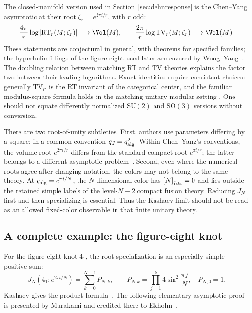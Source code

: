 The closed-manifold version used in Section~\ref{sec:dehnresponse}
is the Chen--Yang asymptotic at their root $\zeta_r=e^{2\pi i/r}$,
with $r$ odd:
\begin{equation}
 \frac{4\pi}{r}\log|\mathrm{RT}_r(M;\zeta_r)|\longrightarrow\Vol(M),
 \qquad
 \frac{2\pi}{r}\log\mathrm{TV}_r(M;\zeta_r)\longrightarrow\Vol(M).
 \label{eq:introclosedvolume}
\end{equation}
These statements are conjectural in general, with theorems for
specified families; the hyperbolic fillings of the figure-eight used
later are covered by Wong--Yang~\cite{WongYangDehn}. The doubling
relation between matching RT and TV theories explains the factor
two between their leading logarithms. Exact identities require
consistent choices: generally $\mathrm{TV}_{\mathcal C}$ is the RT
invariant of the categorical center, and the familiar modulus-square
formula holds in the matching unitary modular setting
\cite{TuraevVirelizier}. One should not equate differently normalized
$\mathrm{SU}(2)$ and $\mathrm{SO}(3)$ versions without conversion.

There are two root-of-unity subtleties. First, authors use parameters
differing by a square: in a common convention $q_J=q_{\rm alg}^2$.
Within Chen--Yang's conventions, the volume root $e^{2\pi i/r}$
differs from the standard compact root $e^{\pi i/r}$; the latter
belongs to a different asymptotic problem~\cite{ChenYang}.
Second, even where the numerical roots agree after changing notation,
the colors may not belong to the same theory. At
$q_{\rm alg}=e^{\pi i/N}$, the $N$-dimensional color has
$[N]_{q_{\rm alg}}=0$ and lies outside the retained simple labels
of the level-$N-2$ compact fusion theory. Reducing $J_N$ first and
then specializing is essential. Thus the Kashaev limit should not
be read as an allowed fixed-color observable in that finite unitary
theory.

\subsection{A complete example: the figure-eight knot}
\label{sec:introfigureeight}

For the figure-eight knot $4_1$, the root specialization is an
especially simple positive sum:
\begin{equation}
 \boxed{\quad
 J_N(4_1;e^{2\pi i/N})=\sum_{k=0}^{N-1}P_{N,k},\qquad
 P_{N,k}=\prod_{j=1}^{k}4\sin^2\frac{\pi j}{N},\quad P_{N,0}=1.
 \quad}
 \label{eq:introfigureproduct}
\end{equation}
Kashaev gives the product formula~\cite[eqs. (2.2), (2.5)]{KashaevVolume}.
The following elementary asymptotic proof is presented by
Murakami and credited there to Ekholm~\cite[Section 3.2]{MurakamiIntro}.

